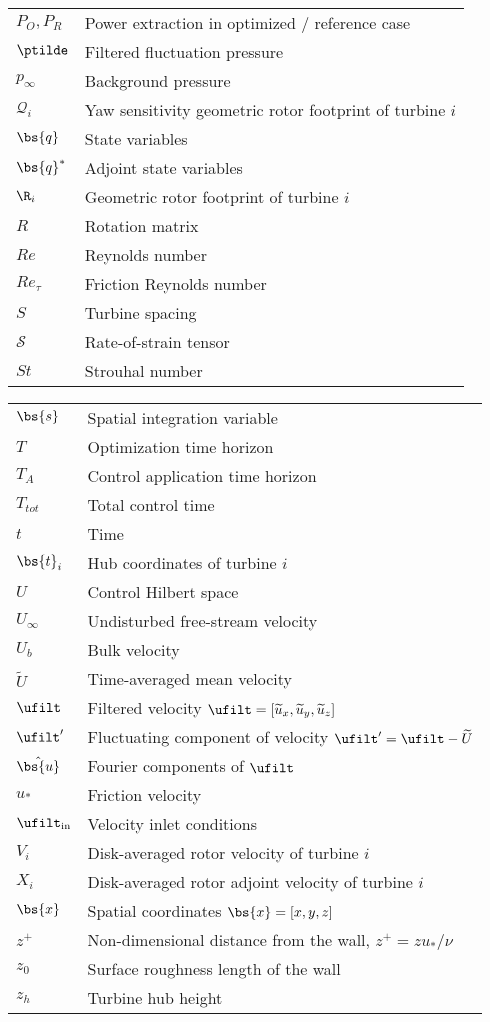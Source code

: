 \begin{tabular}{ p{2cm}  l }
	$P_O, P_R$  & Power extraction in optimized / reference case\\
	$\ptilde$    & Filtered fluctuation pressure\\
	$p_\infty$  & Background pressure\\
	$\mathscr{Q}_i$ & Yaw sensitivity geometric rotor footprint of turbine $i$\\
	$\bs{q}$    & State variables \\
	$\bs{q}^*$  & Adjoint state variables\\
	$\R_i$      & Geometric rotor footprint of turbine $i$\\
	$R$ 		& Rotation matrix\\
	$Re$ 		& Reynolds number\\
	$Re_\tau$   & Friction Reynolds number\\
	$S$ 		& Turbine spacing\\
	$\mathcal{S}$ & Rate-of-strain tensor\\
	$St$    	& Strouhal number\\
\end{tabular}

\begin{tabular}{ p{2cm}  l }
	$\bs{s}$    & Spatial integration variable\\
	$T$     	& Optimization time horizon\\
	$T_A$   	& Control application time horizon\\
	$T_{tot}$ 	& Total control time\\
	$t$   		& Time\\
	$\bs{t}_i$ 	& Hub coordinates of turbine $i$\\
	$U$      	& Control Hilbert space\\
	$U_\infty$ 	& Undisturbed free-stream velocity\\
	$U_b$ 	 	& Bulk velocity\\
	$\widetilde{U}$  	& Time-averaged mean velocity\\ 
	$\ufilt$ 	& Filtered velocity $\ufilt = [\widetilde{u}_x, \widetilde{u}_y, \widetilde{u}_z]$\\
	$\ufilt'$   & Fluctuating component of velocity $\ufilt' = \ufilt - \widetilde{U}$\\
	$\hat{\bs{u}}$ &  Fourier components of $\ufilt$\\
	$u_*$    	& Friction velocity\\
	$\ufilt_{\rm in}$ & Velocity inlet conditions\\
	$V_i$    	& Disk-averaged rotor velocity of turbine $i$\\
	$X_i$    	& Disk-averaged rotor adjoint velocity of turbine $i$\\
	$\bs{x}$  	& Spatial coordinates $\bs{x} = [x,y,z]$\\
	$z^+$    	& Non-dimensional distance from the wall, $z^+ = z u_* / \nu$\\
	$z_0$    	& Surface roughness length of the wall\\
	$z_h$ 	 	& Turbine hub height\\
\end{tabular}

